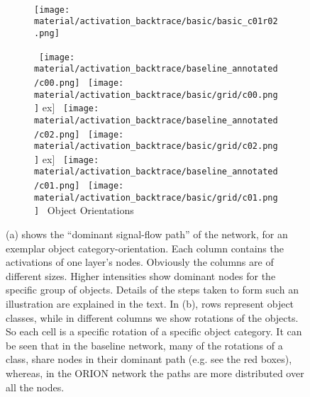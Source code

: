 \documentclass{bmvc2k}
\begin{document}
\begin{figure}[]
  \centering

    \begin{subfigure}{\linewidth} \centering
      \\
      \texttt{[image: material/activation\_backtrace/basic/basic\_c01r02.png]}
      \caption{}
      \label{backtrace_big}
    \end{subfigure}

    \begin{subfigure}{\linewidth} \centering
      ~\texttt{[image: material/activation\_backtrace/baseline\_annotated/c00.png]}
      ~\texttt{[image: material/activation\_backtrace/basic/grid/c00.png]}
      \1ex]
      ~\texttt{[image: material/activation\_backtrace/baseline\_annotated/c02.png]}
      ~\texttt{[image: material/activation\_backtrace/basic/grid/c02.png]}
      \1ex]
      ~\texttt{[image: material/activation\_backtrace/baseline\_annotated/c01.png]}
      ~\texttt{[image: material/activation\_backtrace/basic/grid/c01.png]}
      ~Object Orientations~

      \caption{}
      \label{backtrace_matrix}
    \end{subfigure}
  \vspace*{.5cm}
  \caption{(a) shows the ``dominant signal-flow path'' of the network, for an exemplar object category-orientation. Each column contains the activations of one layer's nodes. Obviously the columns are of different sizes. Higher intensities show dominant nodes for the specific group of objects. Details of the steps taken to form such an illustration are explained in the text. In (b), rows represent object classes, while in different columns we show rotations of the objects. So each cell is a specific rotation of a specific object category. It can be seen that in the baseline network, many of the rotations of a class, share nodes in their dominant path (e.g. see the red boxes), whereas, in the ORION network the paths are more distributed over all the nodes.}
  \label{fig:backtrace}
\end{figure}
\end{document}
